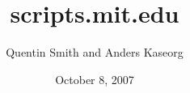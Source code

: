 \documentclass{beamer}
\title{scripts.mit.edu}
\author{Quentin Smith and Anders Kaseorg}
\date{October 8, 2007}
\begin{document}
\begin{frame}
    \titlepage
\end{frame}





\end{document}
